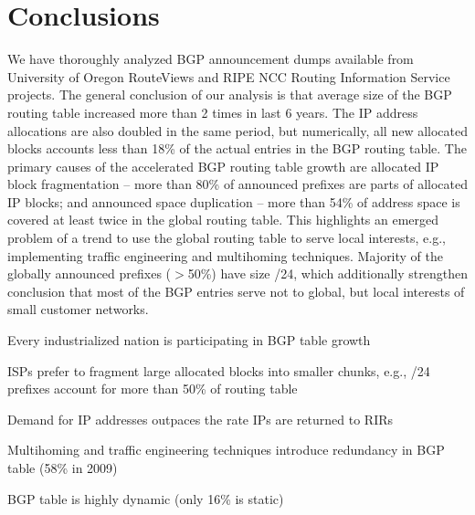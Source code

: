 \section{Conclusions}
\label{sec:conclusions}

We have thoroughly analyzed BGP announcement dumps available from University of Oregon RouteViews and RIPE NCC Routing Information Service projects. The general conclusion of our analysis is that average size of the BGP routing table increased more than 2 times in last 6 years. The IP address allocations are also doubled in the same period, but numerically, all new allocated blocks accounts less than 18\% of the actual entries in the BGP routing table. The primary causes of the accelerated BGP routing table growth are allocated IP block fragmentation -- more than 80\% of announced prefixes are parts of allocated IP blocks; and announced space duplication -- more than 54\% of address space is covered at least twice in the global routing table. This highlights an emerged problem of a trend to use the global routing table to serve local interests, e.g., implementing traffic engineering and multihoming techniques. Majority of the globally announced prefixes ($>$50\%) have size /24, which additionally strengthen conclusion that most of the BGP entries serve not to global, but local interests of small customer networks.




Every industrialized nation is participating in BGP table growth

ISPs prefer to fragment large allocated blocks into smaller chunks, e.g., /24 prefixes account for more than 50\% of routing table

Demand for IP addresses outpaces the rate IPs are returned to RIRs

Multihoming and traffic engineering techniques introduce redundancy in BGP table (58\% in 2009)

BGP table is highly dynamic (only 16\% is static)